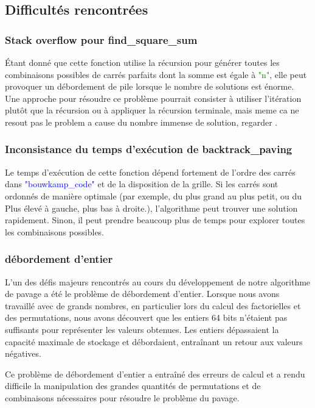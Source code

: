 \documentclass{article}
\begin{document}
\subsection{Difficultés rencontrées }
\subsubsection{Stack overflow pour find\_square\_sum }

Étant donné que cette fonction utilise la récursion pour générer toutes les combinaisons possibles de carrés parfaits dont la somme est égale à \textcolor{green}{"n"}, elle peut provoquer un débordement de pile lorsque le nombre de solutions est énorme. Une approche pour résoudre ce problème pourrait consister à utiliser l'itération plutôt que la récursion ou à appliquer la récursion terminale, mais meme ca ne resout pas le problem a cause du nombre immense de solution, regarder .\newline

\subsubsection{Inconsistance du temps d'exécution de backtrack\_paving}
Le temps d'exécution de cette fonction dépend fortement de l'ordre des carrés dans \textcolor{blue}{"bouwkamp\_code"} et de la disposition de la grille. Si les carrés sont ordonnés de manière optimale (par exemple, du plus grand au plus petit, ou du Plus élevé à gauche, plus bas à droite.), l'algorithme peut trouver une solution rapidement. Sinon, il peut prendre beaucoup plus de temps pour explorer toutes les combinaisons possibles.\newline

\subsubsection{débordement d'entier }
L'un des défis majeurs rencontrés au cours du développement de notre algorithme de pavage a été le problème de débordement d'entier. Lorsque nous avons travaillé avec de grands nombres, en particulier lors du calcul des factorielles et des permutations, nous avons découvert que les entiers 64 bits n'étaient pas suffisants pour représenter les valeurs obtenues. Les entiers dépassaient la capacité maximale de stockage et débordaient, entraînant un retour aux valeurs négatives.\newline

Ce problème de débordement d'entier a entraîné des erreurs de calcul et a rendu difficile la manipulation des grandes quantités de permutations et de combinaisons nécessaires pour résoudre le problème du pavage.\newline
\end{document}
